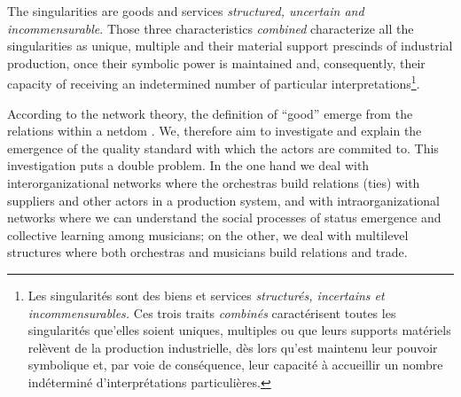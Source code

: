 \documentclass[a4paper, 12pt, openright, oneside, german, french, brazil, english, article]{abntex2}
\begin{document}
	\begin{citacao}
		The singularities are goods and services \textit{structured, uncertain and incommensurable}. Those three characteristics \textit{combined} characterize all the singularities as unique, multiple and their material support prescinds of industrial production, once their symbolic power is maintained and, consequently, their capacity of receiving an indetermined number of particular interpretations\footnote{Les singularités sont des biens et services \textit{structurés, incertains et incommensurables.} Ces trois traits \textit{combinés} caractérisent toutes les singularités que'elles soient uniques, multiples ou que leurs supports matériels relèvent de la production industrielle, dès lors qu'est maintenu leur pouvoir symbolique et, par voie de conséquence, leur capacité à accueillir un nombre indéterminé d'interprétations particulières.}. \cite[p. 164]{karpik2009elements}
	\end{citacao}
	
	
	According to the network theory, the definition of ``good'' emerge from the relations within a netdom \cite{white2008}. We, therefore aim to investigate and explain the emergence of the quality standard with which the actors are commited to. This investigation puts a double problem. In the one hand we deal with interorganizational networks where the orchestras build relations (ties) with suppliers and other actors in a production system, and with intraorganizational networks where we can understand the social processes of status emergence and collective learning among musicians; on the other, we deal with multilevel structures where both orchestras and musicians build relations and trade.
	
\end{document}
